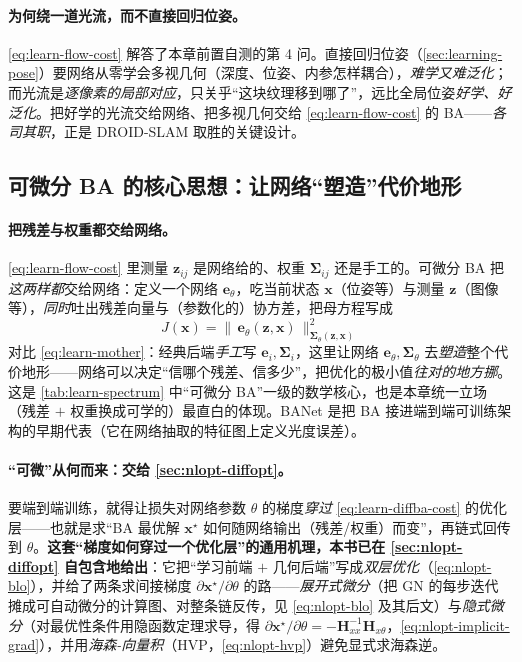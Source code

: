 \paragraph{为何绕一道光流，而不直接回归位姿。}
\cref{eq:learn-flow-cost} 解答了本章前置自测的第 4 问。直接回归位姿（\cref{sec:learning-pose}）要网络从零学会多视几何（深度、位姿、内参怎样耦合），\emph{难学又难泛化}；而光流是\emph{逐像素的局部对应}，只关乎“这块纹理移到哪了”，远比全局位姿\emph{好学、好泛化}\cite{teed2026boosting}。把好学的光流交给网络、把多视几何交给 \cref{eq:learn-flow-cost} 的 BA——\emph{各司其职}，正是 DROID-SLAM 取胜的关键设计。

\subsection{可微分 BA 的核心思想：让网络“塑造”代价地形}
\label{sec:learning-diffba-core}

\paragraph{把残差与权重都交给网络。}
\cref{eq:learn-flow-cost} 里测量 $\mathbf{z}_{ij}$ 是网络给的、权重 $\boldsymbol\Sigma_{ij}$ 还是手工的。可微分 BA 把\emph{这两样都}交给网络：定义一个网络 $\mathbf{e}_\theta$，吃当前状态 $\mathbf{x}$（位姿等）与测量 $\mathbf{z}$（图像等），\emph{同时}吐出残差向量与（参数化的）协方差，把母方程写成
\begin{equation}
  \boxed{\;J(\mathbf{x})=\big\|\,\mathbf{e}_\theta(\mathbf{z},\mathbf{x})\,\big\|_{\boldsymbol\Sigma_\theta(\mathbf{z},\mathbf{x})}^{2}\;}
  \label{eq:learn-diffba-cost}
\end{equation}
对比 \cref{eq:learn-mother}：经典后端\emph{手工}写 $\mathbf{e}_i,\boldsymbol\Sigma_i$，这里让网络 $\mathbf{e}_\theta,\boldsymbol\Sigma_\theta$ 去\emph{塑造}整个代价地形——网络可以决定“信哪个残差、信多少”，把优化的极小值\emph{往对的地方挪}。这是 \cref{tab:learn-spectrum} 中“可微分 BA”一级的数学核心，也是本章统一立场（残差 $+$ 权重换成可学的）最直白的体现。BANet\cite{tang2019banet} 是把 BA 接进端到端可训练架构的早期代表（它在网络抽取的特征图上定义光度误差）。

\paragraph{“可微”从何而来：交给 \cref{sec:nlopt-diffopt}。}
要端到端训练，就得让损失对网络参数 $\theta$ 的梯度\emph{穿过} \cref{eq:learn-diffba-cost} 的优化层——也就是求“BA 最优解 $\mathbf{x}^\star$ 如何随网络输出（残差/权重）而变”，再链式回传到 $\theta$。\textbf{这套“梯度如何穿过一个优化层”的通用机理，本书已在 \cref{sec:nlopt-diffopt} 自包含地给出}：它把“学习前端 $+$ 几何后端”写成\emph{双层优化}（\cref{eq:nlopt-blo}），并给了两条求间接梯度 $\partial\mathbf{x}^\star/\partial\theta$ 的路——\emph{展开式微分}（把 GN 的每步迭代摊成可自动微分的计算图、对整条链反传，见 \cref{eq:nlopt-blo} 及其后文）与\emph{隐式微分}（对最优性条件用隐函数定理求导，得 $\partial\mathbf{x}^\star/\partial\theta=-\mathbf{H}_{xx}^{-1}\mathbf{H}_{x\theta}$，\cref{eq:nlopt-implicit-grad}），并用\emph{海森-向量积}（HVP，\cref{eq:nlopt-hvp}）避免显式求海森逆。

